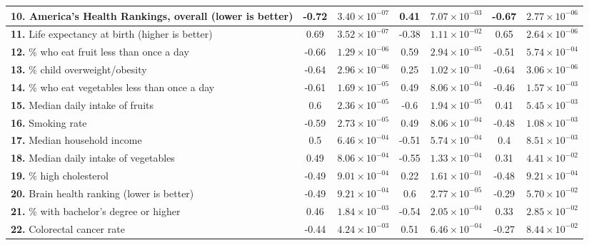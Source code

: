 \begin{table*}
\begin{longtable}{|l|c|c|c|c|c|c|}
 \textbf{10.} America's Health Rankings, overall \cite{america} (lower is better) & -0.72 & $3.40\times 10^{-07}$ & 0.41 & $7.07\times 10^{-03}$ & -0.67 & $2.77\times 10^{-06}$ \\\hline
 \textbf{11.} Life expectancy at birth \cite{kff} (higher is better) & 0.69 & $3.52\times 10^{-07}$ & -0.38 & $1.11\times 10^{-02}$ & 0.65 & $2.64\times 10^{-06}$ \\\hline
 \textbf{12.} \% who eat fruit less than once a day \cite{produce} & -0.66 & $1.29\times 10^{-06}$ & 0.59 & $2.94\times 10^{-05}$ & -0.51 & $5.74\times 10^{-04}$ \\\hline
 \textbf{13.} \% child overweight/obesity \cite{kff} & -0.64 & $2.96\times 10^{-06}$ & 0.25 & $1.02\times 10^{-01}$ & -0.64 & $3.06\times 10^{-06}$ \\\hline
 \textbf{14.} \% who eat vegetables less than once a day \cite{produce} & -0.61 & $1.69\times 10^{-05}$ & 0.49 & $8.06\times 10^{-04}$ & -0.46 & $1.57\times 10^{-03}$ \\\hline
 \textbf{15.} Median daily intake of fruits \cite{produce} & 0.6 & $2.36\times 10^{-05}$ & -0.6 & $1.94\times 10^{-05}$ & 0.41 & $5.45\times 10^{-03}$ \\\hline
 \textbf{16.} Smoking rate \cite{kff} & -0.59 & $2.73\times 10^{-05}$ & 0.49 & $8.06\times 10^{-04}$ & -0.48 & $1.08\times 10^{-03}$ \\\hline
 \textbf{17.} Median household income \cite{kff} & 0.5 & $6.46\times 10^{-04}$ & -0.51 & $5.74\times 10^{-04}$ & 0.4 & $8.51\times 10^{-03}$ \\\hline
 \textbf{18.} Median daily intake of vegetables \cite{produce} & 0.49 & $8.06\times 10^{-04}$ & -0.55 & $1.33\times 10^{-04}$ & 0.31 & $4.41\times 10^{-02}$ \\\hline
 \textbf{19.} \% high cholesterol \cite{america} & -0.49 & $9.01\times 10^{-04}$ & 0.22 & $1.61\times 10^{-01}$ & -0.48 & $9.21\times 10^{-04}$ \\\hline
 \textbf{20.} Brain health ranking \cite{brain} (lower is better) & -0.49 & $9.21\times 10^{-04}$ & 0.6 & $2.77\times 10^{-05}$ & -0.29 & $5.70\times 10^{-02}$ \\\hline
 \textbf{21.} \% with bachelor's degree or higher \cite{census} & 0.46 & $1.84\times 10^{-03}$ & -0.54 & $2.05\times 10^{-04}$ & 0.33 & $2.85\times 10^{-02}$ \\\hline
 \textbf{22.} Colorectal cancer rate \cite{cdc} & -0.44 & $4.24\times 10^{-03}$ & 0.51 & $6.46\times 10^{-04}$ & -0.27 & $8.44\times 10^{-02}$ \\\hline

\end{longtable}
\end{table*}
